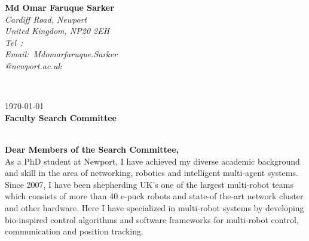 \documentclass[10.9pt]{article}
\begin{document}
\hfill%
\begin{minipage}[t]{.6\textwidth}
\raggedleft%
{\bfseries Md Omar Faruque Sarker}\\[.35ex]
\small\itshape%
Cardiff Road, Newport\\
United Kingdom, NP20 2EH\\[.35ex]
Tel~: \\
Email:~Mdomarfaruque.Sarker\\@newport.ac.uk
\end{minipage}\\[0.5em]
%
\begin{minipage}[t]{.5\textwidth}
\today\\[1.5em]
{\bfseries Faculty Search Committee} 

\end{minipage}\\[1.5em]
\hfill %
\textbf{Dear Members of the Search Committee,}\\[1.5em]

As a PhD student at Newport, I have achieved my diverse academic background and skill in the area of networking, robotics and intelligent multi-agent systems. Since 2007, I have been shepherding UK's one of the largest multi-robot teams which consists of more than 40 e-puck robots and state-of the-art network cluster and other hardware. Here I have specialized in multi-robot systems by developing bio-inspired control algorithms and software frameworks for multi-robot control, communication and  position tracking. %
\end{document}

